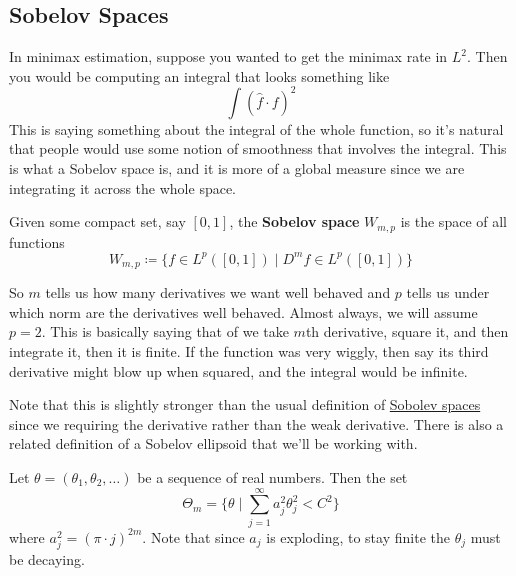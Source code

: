 \subsection{Sobelov Spaces}

  In minimax estimation, suppose you wanted to get the minimax rate in $L^2$. Then you would be computing an integral that looks something like 
  \begin{equation}
    \int (\hat{f} \cdot f)^2
  \end{equation}
  This is saying something about the integral of the whole function, so it's natural that people would use some notion of smoothness that involves the integral. This is what a Sobelov space is, and it is more of a global measure since we are integrating it across the whole space. 

  \begin{definition}
    \label{def:sobolev-space}
    Given some compact set, say $[0, 1]$, the \textbf{Sobelov space} $W_{m, p}$ is the space of all functions 
    \begin{equation}
      W_{m, p} \coloneqq \{ f \in L^p ([0, 1]) \mid D^m f \in L^p([0, 1]) \}
    \end{equation}
  \end{definition}

  So $m$ tells us how many derivatives we want well behaved and $p$ tells us under which norm are the derivatives well behaved. Almost always, we will assume $p = 2$. This is basically saying that of we take $m$th derivative, square it, and then integrate it, then it is finite. If the function was very wiggly, then say its third derivative might blow up when squared, and the integral would be infinite.  

  Note that this is slightly stronger than the usual definition of \hyperref[def:sobolev-space]{Sobolev spaces} since we requiring the derivative rather than the weak derivative. 
  There is also a related definition of a Sobelov ellipsoid that we'll be working with. 

  \begin{definition}
    \label{def:sobelov-ellipsoid}
    Let $\theta = (\theta_1, \theta_2, \ldots)$ be a sequence of real numbers. Then the set 
    \begin{equation}
      \Theta_m = \bigg\{ \theta \mid \sum_{j=1}^\infty a_j^2 \theta_j^2 < C^2 \bigg\}
    \end{equation}
    where $a_j^2 = (\pi \cdot j)^{2m}$. Note that since $a_j$ is exploding, to stay finite the $\theta_j$ must be decaying.
  \end{definition}

